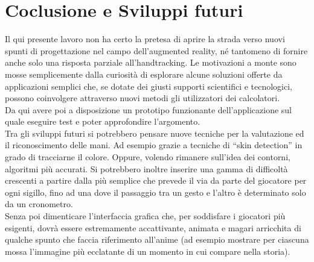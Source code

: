 \documentclass[a4paper,10pt, twocolumn]{article}
\begin{document}
\section{Coclusione e Sviluppi futuri}
  Il qui presente lavoro non ha certo la pretesa di aprire la strada verso nuovi 
  spunti di progettazione nel campo dell'augmented reality,
  n\'{e} tantomeno di fornire anche solo una
  risposta parziale all'handtracking.
  Le motivazioni a monte sono mosse semplicemente dalla curiosit\`{a} di
  esplorare alcune soluzioni offerte da
  applicazioni semplici che, se dotate dei giusti supporti
  scientifici e tecnologici, possono coinvolgere attraverso nuovi metodi
  gli utilizzatori dei calcolatori.\\
  Da qui avere poi a disposizione un prototipo funzionante dell'applicazione
  sul quale eseguire test e poter approfondire l'argomento.\\
  
  Tra gli sviluppi futuri si potrebbero pensare nuove 
  tecniche per la valutazione ed il riconoscimento delle mani.
  Ad esempio grazie a tecniche di ``skin detection'' in grado di
  tracciarne il colore. Oppure, volendo rimanere sull'idea dei 
  contorni, algoritmi pi\`{u} accurati. 
  Si potrebbero inoltre inserire una gamma di difficolt\`{a} crescenti
  a partire dalla pi\`{u} semplice che prevede il via da parte del giocatore
  per ogni sigillo,
  fino ad una dove il passaggio tra un gesto e l'altro \`{e} determinato 
  solo da un cronometro.\\
  Senza poi dimenticare l'interfaccia grafica che,
  per soddisfare i giocatori pi\`{u} esigenti,
  dovr\`{a} essere 
  estremamente accattivante, animata e magari arricchita di qualche
  spunto che faccia riferimento all'anime 
  (ad esempio mostrare per ciascuna mossa l'immagine 
  pi\`{u} ecclatante di un momento in cui compare nella storia).  

\clearpage



\nocite{*}



\end{document}

